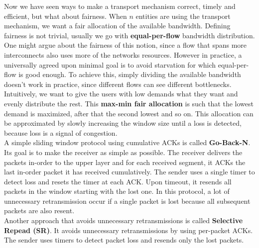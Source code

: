 Now we have seen ways to make a transport mechanism correct, timely and efficient, but what about fairness. When $n$ entities are using the transport mechanism, we want a fair allocation of the available bandwidth. Defining fairness is not trivial, usually we go with \textbf{equal-per-flow} bandwidth distribution. One might argue about the fairness of this notion, since a flow that spans more interconnects also uses more of the networks resources. However in practice, a universally agreed upon minimal goal is to avoid starvation for which equal-per-flow is good enough. To achieve this, simply dividing the available bandwidth doesn't work in practice, since different flows can see different bottlenecks. Intuitively, we want to give the users with low demands what they want and evenly distribute the rest. This \textbf{max-min fair allocation} is such that the lowest demand is maximized, after that the second lowest and so on. This allocation can be approximated by slowly increasing the window size until a loss is detected, because loss is a signal of congestion.\vspace{.3cm}\\

A simple sliding window protocol using cumulative ACKs is called \textbf{Go-Back-N}. Its goal is to make the receiver as simple as possible. The receiver delivers the packets in-order to the upper layer and for each received segment, it ACKs the last in-order packet it has received cumulatively. The sender uses a single timer to detect loss and resets the timer at each ACK. Upon timeout, it resends all packets in the window starting with the lost one. In this protocol, a lot of unnecessary retransmission occur if a single packet is lost because all subsequent packets are also resent.\vspace{.3cm}\\

Another approach that avoids unnecessary retransmissions is called \textbf{Selective Repead (SR)}. It avoids unnecessary retransmissions by using per-packet ACKs. The sender uses timers to detect packet loss and resends only the lost packets. 

